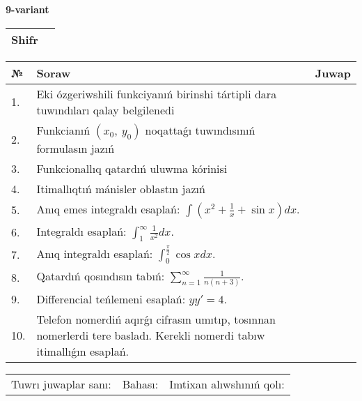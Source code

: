 \documentclass{article}
\begin{document}
  \egroup
  
  \newpage
  
  
  \textbf{9-variant}\\
  
  \bgroup
  \def\arraystretch{1.6} %
  
  \begin{tabular}{|m{5.7cm}|m{9.5cm}|}
  \hline
  Shifr & \\
  \hline
  \end{tabular}
  
  \vspace{1cm}
  
  \begin{tabular}{|m{0.7cm}|m{10cm}|m{4cm}|}
  \hline
  № & Soraw & Juwap \\
  \hline
  1. & Eki ózgeriwshili funkciyanıń birinshi tártipli dara tuwındıları qalay belgilenedi &  \\
  \hline
  2. & Funkcianıń \((x_{0},\ y_{0})\) noqattaǵı tuwındısınıń formulasın jazıń &  \\
  \hline
  3. & Funkcionallıq qatardıń uluwma kórinisi &  \\
  \hline
  4. & Itimallıqtıń mánisler oblastın jazıń &  \\
  \hline
  5. & Anıq emes integraldı esaplań: \(\int{\left( x^2  + \frac{1}{x} + \sin x \right)dx}\). &  \\
  \hline
  6. & Integraldı esaplań: \(\int_{1}^{\infty}{\frac{1}{x^2 }dx}\). &  \\
  \hline
  7. & Anıq integraldı esaplań: \(\int_{0}^{\frac{\pi}{2}}{\cos xdx}\). &  \\
  \hline
  8. & Qatardıń qosındısın tabıń: \(\sum_{n = 1}^{\infty}\frac{1}{n(n + 3)}\). &  \\
  \hline
  9. & Differencial teńlemeni esaplań: \(yy' = 4\). &  \\
  \hline
  10. & Telefon nomerdiń aqırǵı cifrasın umıtıp, tosınnan nomerlerdi tere basladı. Kerekli nomerdi tabıw itimallıǵın esaplań. &  \\
  \hline
  \end{tabular}
  
  \vspace{1cm}
  
  \begin{tabular}{lll}
  Tuwrı juwaplar sanı: \underline{\hspace{1.5cm}} & 
  Bahası: \underline{\hspace{1.5cm}} & 
  Imtixan alıwshınıń qolı: \underline{\hspace{2cm}} \\
  \end{tabular}
  
\end{document}
